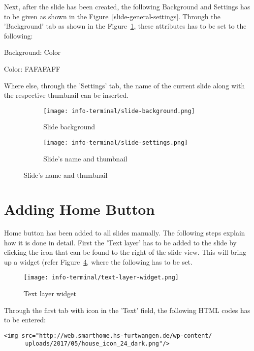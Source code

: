 Next, after the slide has been created, the following Background and Settings has to be given as shown in the Figure~\ref{slide-general-settings}. Through the 'Background' tab as shown in the Figure~\ref{slide-background}, these attributes has to be set to the following:
\begin{itemize*}
\item Background: Color
\item Color: FAFAFAFF
\end{itemize*}
Where else, through the 'Settings' tab, the name of the current slide along with the respective thumbnail can be inserted.
\begin{figure}[ht]
\caption{Slide settings}
\label{slide-general-settings}
\centering
	\begin{subfigure}{.49\linewidth}
	\caption{Slide background}
	\label{slide-background}
	\centering
	\texttt{[image: info-terminal/slide-background.png]}
	\end{subfigure}
	\begin{subfigure}{.49\linewidth}
	\caption{Slide's name and thumbnail}
	\label{slide-settings}
	\centering
	\texttt{[image: info-terminal/slide-settings.png]}
	\end{subfigure}
\end{figure}

\section{Adding Home Button}
Home button has been added to all slides manually. The following steps explain how it is done in detail. First the 'Text layer' has to be added to the slide by clicking the  icon that can be found to the right of the slide view. This will bring up a widget (refer Figure~\ref{text-layer-widget}, where the following has to be set.
\begin{figure}[ht]
\caption{Text layer widget}
\label{text-layer-widget}
\centering
\texttt{[image: info-terminal/text-layer-widget.png]}
\end{figure}

Through the first tab with icon  in the 'Text' field, the following HTML codes has to be entered:
\begin{lstlisting}
<img src="http://web.smarthome.hs-furtwangen.de/wp-content/
      uploads/2017/05/house_icon_24_dark.png"/>
\end{lstlisting}

